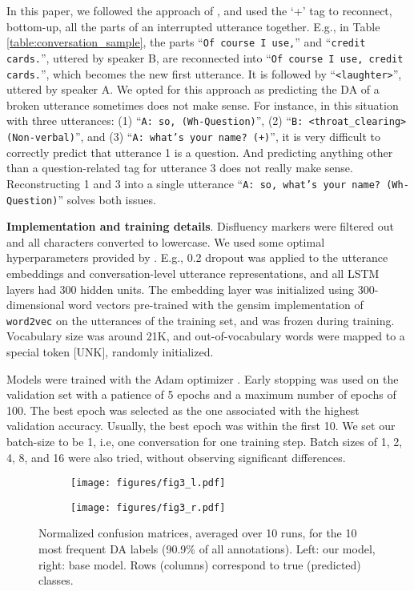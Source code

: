 \documentclass[11pt,a4paper]{article}
\begin{document}
In this paper, we followed the approach of \citep{webb2005dialogue,milajevs-purver-2014-investigating,kim2017compositional}, and used the `+' tag to reconnect, bottom-up, all the parts of an interrupted utterance together.
E.g., in Table \ref{table:conversation_sample}, the parts ``{\small \texttt{Of course I use,}}'' and ``{\small \texttt{credit cards.}}'', uttered by speaker B, are reconnected into ``{\small \texttt{Of course I use, credit cards.}}'', which becomes the new first utterance.
It is followed by ``{\small \texttt{<laughter>}}'', uttered by speaker A.
We opted for this approach as predicting the DA of a broken utterance sometimes does not make sense.
For instance, in this situation with three utterances: (1) ``{\small \texttt{A: so, (Wh-Question)}}'', (2) ``{\small \texttt{B: <throat\_clearing> (Non-verbal)}}'', and (3) ``{\small \texttt{A: what's your name? (+)}}'', it is very difficult to correctly predict that utterance 1 is a question.
And predicting anything other than a question-related tag for utterance 3 does not really make sense.
Reconstructing 1 and 3 into a single utterance ``{\small \texttt{A: so, what's your name? (Wh-Question)}}'' solves both issues.

\noindent\textbf{Implementation and training details}.
Disfluency markers \citep{meteer1995dysfluency} were filtered out and all characters converted to lowercase.
We used some optimal hyperparameters provided by \citet{kumar2018dialogue}.
E.g., 0.2 dropout was applied to the utterance embeddings and conversation-level utterance representations, and all LSTM layers had 300 hidden units.
The embedding layer was initialized using 300-dimensional word vectors pre-trained with the gensim \cite{rehurek_lrec} implementation of {\small\texttt{word2vec}} \citep{mikolov2013efficient} on the utterances of the training set, and was frozen during training.
Vocabulary size was around 21K, and out-of-vocabulary words were mapped to a special token [UNK], randomly initialized. 

Models were trained with the Adam optimizer \citep{kingma2014adam}.
Early stopping was used on the validation set with a patience of 5 epochs and a maximum number of epochs of 100.
The best epoch was selected as the one associated with the highest validation accuracy. 
Usually, the best epoch was within the first 10.
We set our batch-size to be 1, i.e, one conversation for one training step.
Batch sizes of 1, 2, 4, 8, and 16 were also tried, without observing significant differences.

\begin{figure*}[ht]
\centering
\begin{subfigure}[t]{0.49\textwidth}
\centering
\texttt{[image: figures/fig3\_l.pdf]}
\end{subfigure}
\begin{subfigure}[t]{0.49\textwidth}
\centering
\texttt{[image: figures/fig3\_r.pdf]}
\end{subfigure}
\caption{Normalized confusion matrices, averaged over 10 runs, for the 10 most frequent DA labels (90.9\% of all annotations).
Left: our model, right: base model.
Rows (columns) correspond to true (predicted) classes.}
\label{fig:confusion}
\end{figure*}
\end{document}
